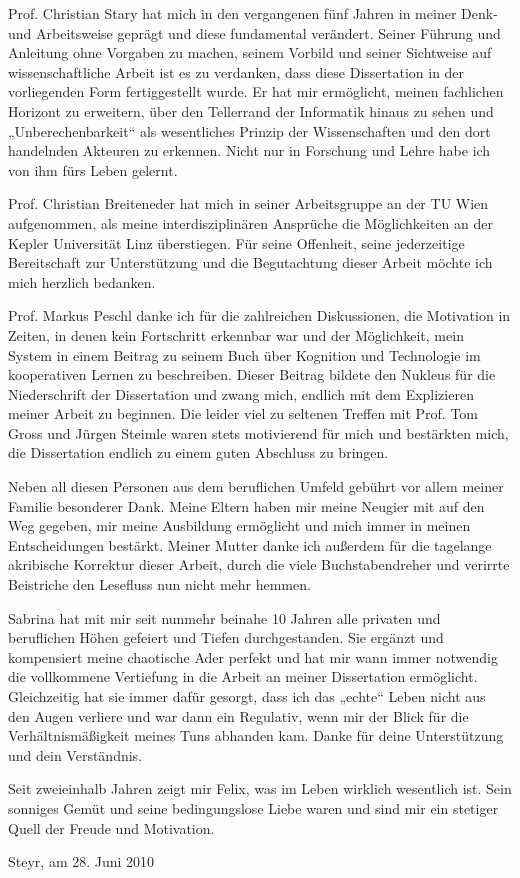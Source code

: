 Prof. Christian Stary hat mich in den vergangenen fünf Jahren in meiner Denk- und Arbeitsweise geprägt und diese fundamental verändert. Seiner Führung und Anleitung ohne Vorgaben zu machen, seinem Vorbild und seiner Sichtweise auf wissenschaftliche Arbeit ist es zu verdanken, dass diese Dissertation in der vorliegenden Form fertiggestellt wurde. Er hat mir ermöglicht, meinen fachlichen Horizont zu erweitern, über den Tellerrand der Informatik hinaus zu sehen und „Unberechenbarkeit“ als wesentliches Prinzip der Wissenschaften und den dort handelnden Akteuren zu erkennen. Nicht nur in Forschung und Lehre habe ich von ihm fürs Leben gelernt.

Prof. Christian Breiteneder hat mich in seiner Arbeitsgruppe an der TU Wien aufgenommen, als meine interdisziplinären Ansprüche die Möglichkeiten an der Kepler Universität Linz überstiegen. Für seine Offenheit, seine jederzeitige Bereitschaft zur Unterstützung und die Begutachtung dieser Arbeit möchte ich mich herzlich bedanken.

Prof. Markus Peschl danke ich für die zahlreichen Diskussionen, die Motivation in Zeiten, in denen kein Fortschritt erkennbar war und der Möglichkeit, mein System in einem Beitrag zu seinem Buch über Kognition und Technologie im kooperativen Lernen zu beschreiben. Dieser Beitrag bildete den Nukleus für die Niederschrift der Dissertation und zwang mich, endlich mit dem Explizieren meiner Arbeit zu beginnen. Die leider viel zu seltenen Treffen mit Prof. Tom Gross und Jürgen Steimle waren stets motivierend für mich und bestärkten mich, die Dissertation endlich zu einem guten Abschluss zu bringen.

Neben all diesen Personen aus dem beruflichen Umfeld gebührt vor allem meiner Familie besonderer Dank. Meine Eltern haben mir meine Neugier mit auf den Weg gegeben, mir meine Ausbildung ermöglicht und mich immer in meinen Entscheidungen bestärkt. Meiner Mutter danke ich außerdem für die tagelange akribische Korrektur dieser Arbeit, durch die viele Buchstabendreher und verirrte Beistriche den Lesefluss nun nicht mehr hemmen.

Sabrina hat mit mir seit nunmehr beinahe 10 Jahren alle privaten und beruflichen Höhen gefeiert und Tiefen durchgestanden. Sie ergänzt und kompensiert meine chaotische Ader perfekt und hat mir wann immer notwendig die vollkommene Vertiefung in die Arbeit an meiner Dissertation ermöglicht. Gleichzeitig hat sie immer dafür gesorgt, dass ich das „echte“ Leben nicht aus den Augen verliere und war dann ein Regulativ, wenn mir der Blick für die Verhältnismäßigkeit meines Tuns abhanden kam. Danke für deine Unterstützung und dein Verständnis.

Seit zweieinhalb Jahren zeigt mir Felix, was im Leben wirklich wesentlich ist. Sein sonniges Gemüt und seine bedingungslose Liebe waren und sind mir ein stetiger Quell der Freude und Motivation. 

\begin{flushright}
 Steyr, am 28. Juni 2010
\end{flushright}

